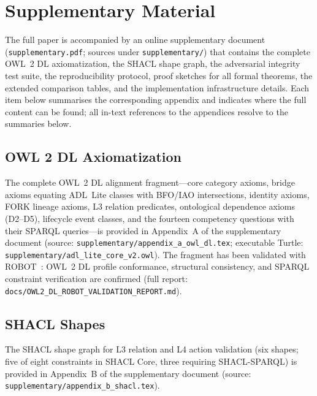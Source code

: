 \documentclass[11pt,a4paper]{article}
\theoremstyle{definition}
\theoremstyle{remark}
\begin{document}
\appendix
\section{Supplementary Material}\label{app:supplementary}

The full paper is accompanied by an online supplementary document
(\texttt{supplementary.pdf}; sources under \texttt{supplementary/}) that
contains the complete OWL~2 DL axiomatization, the SHACL shape graph, the
adversarial integrity test suite, the reproducibility protocol, proof
sketches for all formal theorems, the extended comparison tables, and the
implementation infrastructure details. Each item below summarises the
corresponding appendix and indicates where the full content can be found;
all in-text references to the appendices resolve to the summaries below.

\subsection{OWL 2 DL Axiomatization}\label{app:owl-dl}
The complete OWL~2 DL alignment fragment---core category axioms, bridge
axioms equating ADL~Lite classes with BFO/IAO intersections, identity axioms,
FORK lineage axioms, L3 relation predicates, ontological dependence axioms
(D2--D5), lifecycle event classes, and the fourteen competency questions with
their SPARQL queries---is provided in Appendix~A of the supplementary document
(source: \texttt{supplementary/appendix\_a\_owl\_dl.tex}; executable Turtle:
\texttt{supplementary/adl\_lite\_core\_v2.owl}). The fragment has been
validated with ROBOT~\cite{jackson2019robot}: OWL~2 DL profile conformance,
structural consistency, and SPARQL constraint verification are confirmed
(full report: \texttt{docs/OWL2\_DL\_ROBOT\_VALIDATION\_REPORT.md}).
\label{subsec:validation-robot}

\subsection{SHACL Shapes}\label{app:shacl}
The SHACL shape graph for L3 relation and L4 action validation (six shapes;
five of eight constraints in SHACL Core, three requiring SHACL-SPARQL) is
provided in Appendix~B of the supplementary document (source:
\texttt{supplementary/appendix\_b\_shacl.tex}).
\end{document}
